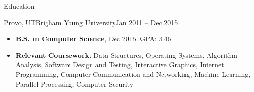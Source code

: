 \documentclass[]{lastcv}
\begin{document}
	\makeheader
	
	\begin{cvsection}{Education}
		\begin{cvsubsection}{Provo, UT}{Brigham Young University}{Jan 2011 -- Dec 2015}
			\begin{itemize}
				\item \textbf{B.S. in Computer Science}, Dec 2015. GPA: 3.46
				\item \textbf{Relevant Coursework:} Data Structures, Operating Systems, Algorithm Analysis, Software Design and Testing, Interactive Graphics, Internet Programming, Computer Communication and Networking, Machine Learning, Parallel Processing, Computer Security
			\end{itemize}
		\end{cvsubsection}
	\end{cvsection}
	
\end{document}
